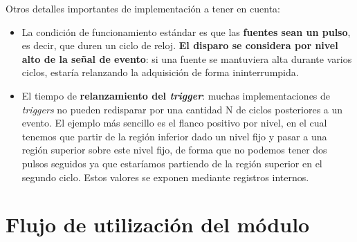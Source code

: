 Otros detalles importantes de implementación a tener en cuenta:
\begin{itemize}
  \item La condición de funcionamiento estándar es que las \textbf{fuentes
    sean un pulso}, es decir, que duren un ciclo de reloj. \textbf{El disparo
    se considera por nivel alto de la señal de evento}: si una fuente se
    mantuviera alta durante varios ciclos, estaría relanzando la adquisición
    de forma ininterrumpida.
  \item El tiempo de \textbf{relanzamiento del \emph{trigger}}: muchas
    implementaciones de \emph{triggers} no pueden redisparar por una cantidad N de
    ciclos posteriores a un evento. El ejemplo más sencillo es el flanco
    positivo por nivel, en el cual tenemos que partir de la región inferior
    dado un nivel fijo y pasar a una región superior sobre este nivel fijo, de
    forma que no podemos tener dos pulsos seguidos ya que estaríamos partiendo
    de la región superior en el segundo ciclo. Estos valores se exponen mediante registros internos.

\end{itemize}

\section{Flujo de utilización del módulo}
\label{S:mt-flujo}

